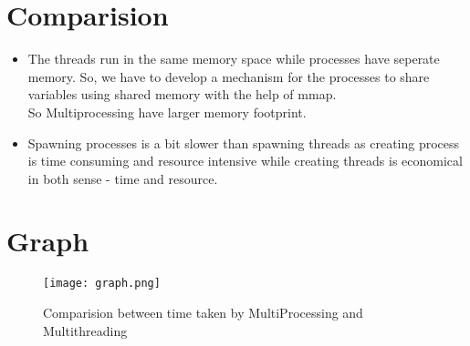 \documentclass[12pt]{article}
\begin{document}
\section{Comparision}

\begin{itemize}
\item The threads run in the same memory space while processes have seperate memory.
So, we have to develop a mechanism for the processes to share variables using shared memory with the help of mmap.\\
So Multiprocessing have larger memory footprint.\\

\item Spawning processes is a bit slower than spawning threads as creating process is time consuming and resource intensive while creating threads is economical in both sense - time and resource.

\end{itemize}

\section{Graph}
\begin{figure}[ht!]
\texttt{[image: graph.png]}
\caption{Comparision between time taken by MultiProcessing and Multithreading \label{overflow}}
\end{figure}
\end{document}
